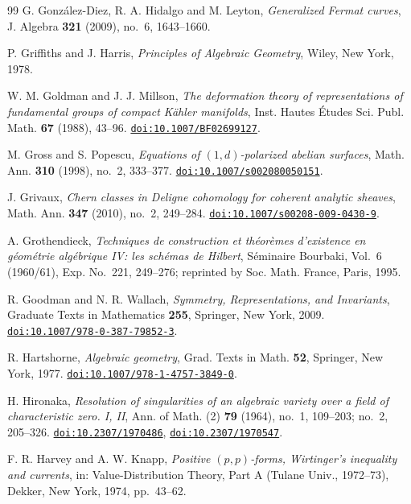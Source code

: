 \begin{thebibliography}{99}
G. Gonz\'alez-Diez, R. A. Hidalgo and M. Leyton,
\emph{Generalized Fermat curves},
J. Algebra \textbf{321} (2009), no.~6, 1643--1660.

P. Griffiths and J. Harris,
\emph{Principles of Algebraic Geometry},
Wiley, New York, 1978.

W. M. Goldman and J. J. Millson,
\emph{The deformation theory of representations of fundamental groups of
compact K\"ahler manifolds},
Inst. Hautes \'Etudes Sci. Publ. Math. \textbf{67} (1988), 43--96.
\href{https://doi.org/10.1007/BF02699127}{\texttt{doi:10.1007/BF02699127}}.

M. Gross and S. Popescu,
\emph{Equations of $(1,d)$-polarized abelian surfaces},
Math. Ann. \textbf{310} (1998), no.~2, 333--377.
\href{https://doi.org/10.1007/s002080050151}{\texttt{doi:10.1007/s002080050151}}.

J. Grivaux,
\emph{Chern classes in Deligne cohomology for coherent analytic sheaves},
Math. Ann. \textbf{347} (2010), no.~2, 249--284.
\href{https://doi.org/10.1007/s00208-009-0430-9}{\texttt{doi:10.1007/s00208-009-0430-9}}.

A. Grothendieck,
\emph{Techniques de construction et th\'eor\`emes d'existence en g\'eom\'etrie
alg\'ebrique IV: les sch\'emas de Hilbert},
S\'eminaire Bourbaki, Vol.~6 (1960/61), Exp. No.~221, 249--276;
reprinted by Soc. Math. France, Paris, 1995.

R. Goodman and N. R. Wallach,
\emph{Symmetry, Representations, and Invariants},
Graduate Texts in Mathematics \textbf{255}, Springer, New York, 2009.
\href{https://doi.org/10.1007/978-0-387-79852-3}{\texttt{doi:10.1007/978-0-387-79852-3}}.

R. Hartshorne,
\emph{Algebraic geometry},
Grad. Texts in Math. \textbf{52}, Springer, New York, 1977.
\href{https://doi.org/10.1007/978-1-4757-3849-0}{\texttt{doi:10.1007/978-1-4757-3849-0}}.

H. Hironaka,
\emph{Resolution of singularities of an algebraic variety over a field of
characteristic zero. I, II},
Ann. of Math. (2) \textbf{79} (1964), no.~1, 109--203; no.~2, 205--326.
\href{https://doi.org/10.2307/1970486}{\texttt{doi:10.2307/1970486}},
\href{https://doi.org/10.2307/1970547}{\texttt{doi:10.2307/1970547}}.

F. R. Harvey and A. W. Knapp,
\emph{Positive $(p,p)$-forms, Wirtinger's inequality and currents},
in: Value-Distribution Theory, Part A (Tulane Univ., 1972--73),
Dekker, New York, 1974, pp.~43--62.


\end{thebibliography}
